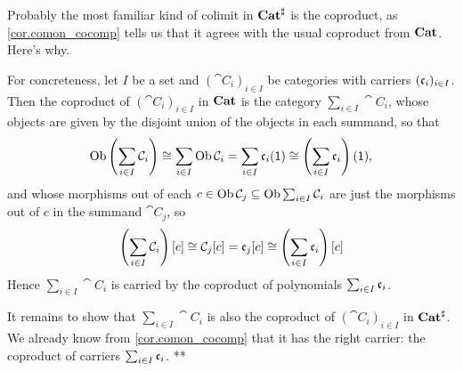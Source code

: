 \documentclass[Book-Poly]{subfiles}
\begin{document}
\begin{example}
Probably the most familiar kind of colimit in $\mathbf{Cat}^\sharp$ is the coproduct, as \cref{cor.comon_cocomp} tells us that it agrees with the usual coproduct from $\mathbf{Cat}$.
Here's why.

For concreteness, let $I$ be a set and $(\cat{C}_i)_{i\in I}$ be categories with carriers $(\mathfrak{c}_i)_{i\in I}$.
Then the coproduct of $(\cat{C}_i)_{i\in I}$ in $\mathbf{Cat}$ is the category $\sum_{i\in I}\cat{C}_i$, whose objects are given by the disjoint union of the objects in each summand, so that
\[
    \operatorname{Ob}\left(\sum_{i\in I}\mathcal{C}_i\right)\cong\sum_{i\in I}\operatorname{Ob}\mathcal{C}_i=\sum_{i\in I}\mathfrak{c}_i(\textsf{1})\cong\left(\sum_{i\in I}\mathfrak{c}_i\right)(\textsf{1}),
\]
and whose morphisms out of each $c\in\operatorname{Ob}\mathcal{C}_j\subseteq\operatorname{Ob}\sum_{i\in I}\mathcal{C}_i$ are just the morphisms out of $c$ in the summand $\cat{C}_j$, so
\[
    \left(\sum_{i\in I}\mathcal{C}_i\right)[c]\cong\mathcal{C}_j[c]=\mathfrak{c}_j[c]\cong\left(\sum_{i\in I}\mathfrak{c}_i\right)[c]
\]
Hence $\sum_{i\in I}\cat{C}_i$ is carried by the coproduct of polynomials $\sum_{i\in I}\mathfrak{c}_i$.

It remains to show that $\sum_{i\in I}\cat{C}_i$ is also the coproduct of $(\cat{C}_i)_{i\in I}$ in $\mathbf{Cat}^\sharp$.
We already know from \cref{cor.comon_cocomp} that it has the right carrier: the coproduct of carriers $\sum_{i\in I}\mathfrak{c}_i$. **






\end{example}
\end{document}
